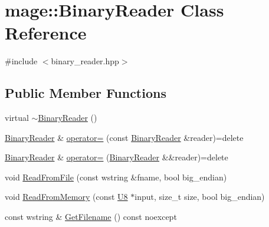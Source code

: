 \hypertarget{classmage_1_1_binary_reader}{}\section{mage\+:\+:Binary\+Reader Class Reference}
\label{classmage_1_1_binary_reader}


{\ttfamily \#include $<$binary\+\_\+reader.\+hpp$>$}

\subsection*{Public Member Functions}
\begin{DoxyCompactItemize}
\item 
virtual \hyperlink{classmage_1_1_binary_reader_a42e6c31bc53f5214675f845756b5a404}{$\sim$\+Binary\+Reader} ()
\item 
\hyperlink{classmage_1_1_binary_reader}{Binary\+Reader} \& \hyperlink{classmage_1_1_binary_reader_a0408bb456983b4a03ae42ab69c6f4bc3}{operator=} (const \hyperlink{classmage_1_1_binary_reader}{Binary\+Reader} \&reader)=delete
\item 
\hyperlink{classmage_1_1_binary_reader}{Binary\+Reader} \& \hyperlink{classmage_1_1_binary_reader_abb971fe92727a0e86b3698dba8c586de}{operator=} (\hyperlink{classmage_1_1_binary_reader}{Binary\+Reader} \&\&reader)=delete
\item 
void \hyperlink{classmage_1_1_binary_reader_aa9cc5e2bd41cd5ae5ee421ee9a1e10b2}{Read\+From\+File} (const wstring \&fname, bool big\+\_\+endian)
\item 
void \hyperlink{classmage_1_1_binary_reader_afac22c8586ceee77895121e904de1845}{Read\+From\+Memory} (const \hyperlink{namespacemage_afc638980bc6154f15af5e2d93a0e0ea9}{U8} $\ast$input, size\+\_\+t size, bool big\+\_\+endian)
\item 
const wstring \& \hyperlink{classmage_1_1_binary_reader_ad9d4a4a3e2f0afc666d15badff08fe4a}{Get\+Filename} () const noexcept
\end{DoxyCompactItemize}
